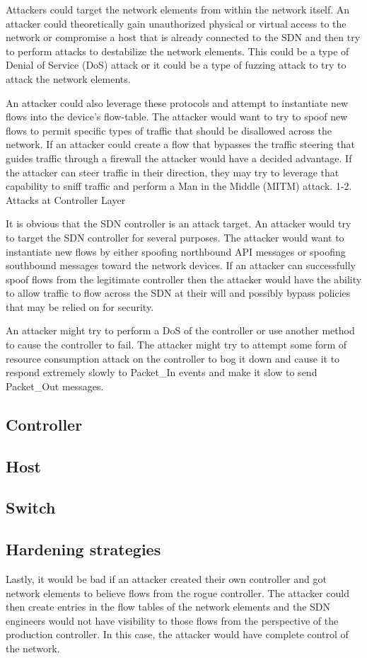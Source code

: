 Attackers could target the network elements from within the network itself.  An attacker could theoretically gain unauthorized physical or virtual access to the network or compromise a host that is already connected to the SDN and then try to perform attacks to destabilize the network elements.  This could be a type of Denial of Service (DoS) attack or it could be a type of fuzzing attack to try to attack the network elements.

An attacker could also leverage these protocols and attempt to instantiate new flows into the device’s flow-table.  The attacker would want to try to spoof new flows to permit specific types of traffic that should be disallowed across the network.  If an attacker could create a flow that bypasses the traffic steering that guides traffic through a firewall the attacker would have a decided advantage.  If the attacker can steer traffic in their direction, they may try to leverage that capability to sniff traffic and perform a Man in the Middle (MITM) attack.
1-2. Attacks at Controller Layer

It is obvious that the SDN controller is an attack target.  An attacker would try to target the SDN controller for several purposes.  The attacker would want to instantiate new flows by either spoofing northbound API messages or spoofing southbound messages toward the network devices.  If an attacker can successfully spoof flows from the legitimate controller then the attacker would have the ability to allow traffic to flow across the SDN at their will and possibly bypass policies that may be relied on for security.

An attacker might try to perform a DoS of the controller or use another method to cause the controller to fail. The attacker might try to attempt some form of resource consumption attack on the controller to bog it down and cause it to respond extremely slowly to Packet\_In events and make it slow to send Packet\_Out messages.

\subsection{Controller}
\subsection{Host}
\subsection{Switch}
\subsection{Hardening strategies}
Lastly, it would be bad if an attacker created their own controller and got network elements to believe flows from the rogue controller.  The attacker could then create entries in the flow tables of the network elements and the SDN engineers would not have visibility to those flows from the perspective of the production controller.  In this case, the attacker would have complete control of the network.

